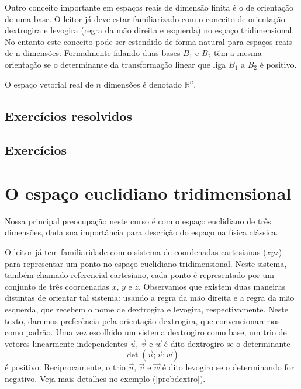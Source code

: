 Outro conceito importante em espaços reais de dimensão finita é o de orientação de uma base. O leitor já deve estar familiarizado com o conceito de orientação dextrogira e levogira (regra da mão direita e esquerda) no espaço tridimensional. No entanto este conceito pode ser estendido de forma natural para espaços reais de n-dimensões. Formalmente falando duas bases $B_1$ e $B_2$ têm a mesma orientação se o determinante da transformação linear que liga $B_1$ a $B_2$ é positivo.    

O espaço vetorial real de $n$ dimensões é denotado $\mathbb{R}^n$. 

\subsection*{Exercícios resolvidos}

\construirExeresol

\subsection*{Exercícios}

\construirExer


\section{O espaço euclidiano tridimensional}
Nossa principal preocupação neste curso é com o espaço euclidiano de três dimensões, dada sua importância para descrição do espaço na física clássica.  
 
O leitor já tem familiaridade com o sistema de coordenadas cartesianas ($xyz$) para representar um ponto no espaço euclidiano tridimensional. Neste sistema, também chamado referencial cartesiano, cada ponto é representado por um conjunto de três coordenadas $x$, $y$ e $z$. Observamos que existem duas maneiras distintas de orientar tal sistema: usando a regra da mão direita e a regra da mão esquerda, que recebem o nome de dextrogira e levogira, respectivamente. Neste texto, daremos preferência pela orientação dextrogira, que convencionaremos como padrão. Uma vez escolhido um sistema dextrogiro como base,  um trio de vetores linearmente independentes $\vec{u}$, $\vec{v}$ e  $\vec{w}$ é dito dextrogiro se o determinante 
\begin{equation}\label{defdextro}
\det\left(\vec{u};\vec{v};\vec{w}\right)
\end{equation}   
é positivo. Reciprocamente, o trio  $\vec{u}$, $\vec{v}$ e  $\vec{w}$ é dito levogiro se o determinando for negativo. Veja mais detalhes no exemplo (\ref{probdextro}).

